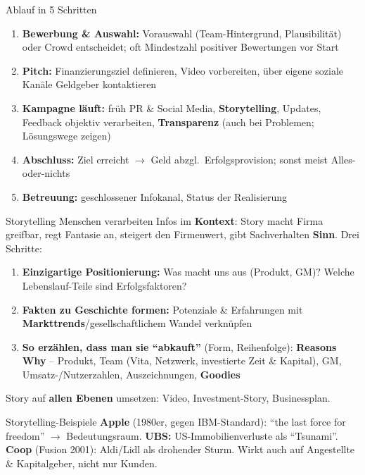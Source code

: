 \documentclass[a4paper, fontsize=7pt]{scrartcl}
\begin{document}
\begin{mainbox}{Ablauf in 5 Schritten}
\begin{enumerate}
    \item \textbf{Bewerbung \& Auswahl:} Vorauswahl (Team-Hintergrund,
    Plausibilität) oder Crowd entscheidet; oft Mindestzahl positiver
    Bewertungen vor Start
    \item \textbf{Pitch:} Finanzierungsziel definieren, Video vorbereiten,
    über eigene soziale Kanäle Geldgeber kontaktieren
    \item \textbf{Kampagne läuft:} früh PR \& Social Media,
    \textbf{Storytelling}, Updates, Feedback objektiv verarbeiten,
    \textbf{Transparenz} (auch bei Problemen; Lösungswege zeigen)
    \item \textbf{Abschluss:} Ziel erreicht $\to$ Geld abzgl.\
    Erfolgsprovision; sonst meist Alles-oder-nichts
    \item \textbf{Betreuung:} geschlossener Infokanal, Status der Realisierung
\end{enumerate}
\end{mainbox}

\begin{mainbox}{Storytelling}
Menschen verarbeiten Infos im \textbf{Kontext}: Story macht Firma greifbar,
regt Fantasie an, steigert den Firmenwert, gibt Sachverhalten \textbf{Sinn}.
Drei Schritte:
\begin{enumerate}
    \item \textbf{Einzigartige Positionierung:} Was macht uns aus (Produkt,
    GM)? Welche Lebenslauf-Teile sind Erfolgsfaktoren?
    \item \textbf{Fakten zu Geschichte formen:} Potenziale \& Erfahrungen mit
    \textbf{Markttrends}/gesellschaftlichem Wandel verknüpfen
    \item \textbf{So erzählen, dass man sie ``abkauft''} (Form, Reihenfolge):
    \textbf{Reasons Why} -- Produkt, Team (Vita, Netzwerk, investierte Zeit \&
    Kapital), GM, Umsatz-/Nutzerzahlen, Auszeichnungen, \textbf{Goodies}
\end{enumerate}
Story auf \textbf{allen Ebenen} umsetzen: Video, Investment-Story, Businessplan.
\end{mainbox}

\begin{subbox}{Storytelling-Beispiele}
\textbf{Apple} (1980er, gegen IBM-Standard): ``the last force for freedom''
$\to$ Bedeutungsraum. \textbf{UBS:} US-Immobilienverluste als ``Tsunami''.
\textbf{Coop} (Fusion 2001): Aldi/Lidl als drohender Sturm. Wirkt auch auf
Angestellte \& Kapitalgeber, nicht nur Kunden.
\end{subbox}
\end{document}
